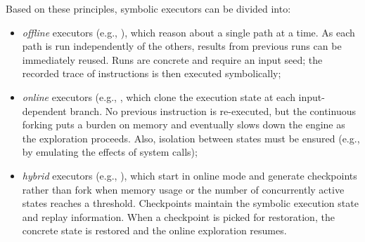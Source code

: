 \noindent Based on these principles, symbolic executors can be divided into:

\begin{itemize}
  \item {\em offline} executors (e.g., \cite{SAGE-NDSS08}), which reason about a single path at a time. As each path is run independently of the others, results from previous runs can be immediately reused. Runs are concrete and require an input seed; the recorded trace of instructions is then executed symbolically;
  \item {\em online} executors (e.g., \cite{KLEE-OSDI08,CKC-TOCS12,AEG-NDSS11}, which clone the execution state at each input-dependent branch. No previous instruction is re-executed, but the continuous forking puts a burden on memory and eventually slows down the engine as the exploration proceeds. Also, isolation between states must be ensured (e.g., by emulating the effects of system calls);
  \item {\em hybrid} executors (e.g., \cite{MAYHEM-SP12}), which start in online mode and generate checkpoints rather than fork when memory usage or the number of concurrently active states reaches a threshold. Checkpoints maintain the symbolic execution state and replay information. When a checkpoint is picked for restoration, the concrete state is restored and the online exploration resumes.
\end{itemize}

